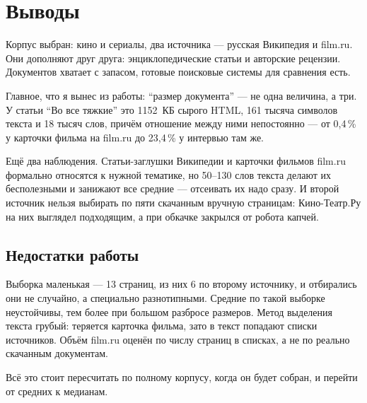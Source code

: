 \section{Выводы}

Корпус выбран: кино и сериалы, два источника --- русская Википедия и film.ru. Они
дополняют друг друга: энциклопедические статьи и авторские рецензии. Документов хватает
с запасом, готовые поисковые системы для сравнения есть.

Главное, что я вынес из работы: \enquote{размер документа} --- не одна величина, а три.
У статьи \enquote{Во все тяжкие} это 1152~КБ сырого HTML, 161 тысяча символов текста и
18 тысяч слов, причём отношение между ними непостоянно --- от 0,4\,\% у карточки фильма
на film.ru до 23,4\,\% у интервью там же.

Ещё два наблюдения. Статьи-заглушки Википедии и карточки фильмов film.ru формально
относятся к нужной тематике, но 50--130 слов текста делают их бесполезными и занижают
все средние --- отсеивать их надо сразу. И второй источник нельзя выбирать по пяти
скачанным вручную страницам: Кино-Театр.Ру на них выглядел подходящим, а при обкачке
закрылся от робота капчей.

\subsection*{Недостатки работы}

Выборка маленькая --- 13 страниц, из них 6 по второму источнику, и отбирались они не
случайно, а специально разнотипными. Средние по такой выборке неустойчивы, тем более
при большом разбросе размеров. Метод выделения текста грубый: теряется карточка фильма,
зато в текст попадают списки источников. Объём film.ru оценён по числу страниц в
списках, а не по реально скачанным документам.

Всё это стоит пересчитать по полному корпусу, когда он будет собран, и перейти от
средних к медианам.

\pagebreak
